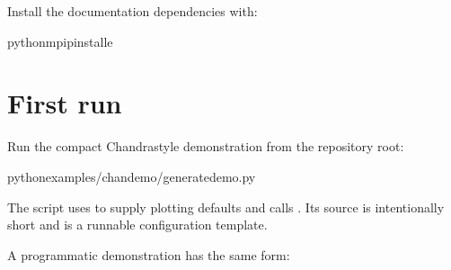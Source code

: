 \documentclass[letterpaper,10pt,english]{sphinxmanual}
\begin{document}
\sphinxAtStartPar
Install the documentation dependencies with:

\begin{sphinxVerbatim}[commandchars=\\\{\}]
python\PYGZhy{}mpipinstall\PYGZhy{}e
\end{sphinxVerbatim}


\section{First run}
\label{\detokenize{getting_started:first-run}}
\sphinxAtStartPar
Run the compact Chandra\sphinxhyphen{}style demonstration from the repository root:

\begin{sphinxVerbatim}[commandchars=\\\{\}]
pythonexamples/chan\PYGZus{}demo/generate\PYGZus{}demo.py
\end{sphinxVerbatim}

\sphinxAtStartPar
The script uses {\hyperref[\detokenize{api:pcat.demo.run_pipeline_demo}]{}} to supply plotting defaults
and calls {\hyperref[\detokenize{api:pcat.main.sample}]{}}. Its source is intentionally short and is a
runnable configuration template.

\sphinxAtStartPar
A programmatic demonstration has the same form:
\end{document}
